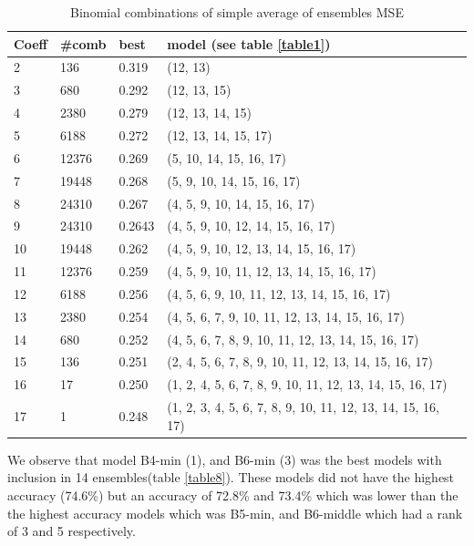 \documentclass[10pt,letterpaper]{article}
\begin{document}
\begin{center}
\begin{table}[hbt!]
\caption{Binomial combinations of simple average of ensembles MSE}
\begin{tabular}{ |l|l|l|l| }
\hline
Coeff & \#comb & best & model  (see table \ref{table1}) \\ \hline
2 & 136 & 0.319 & (12, 13) \\ \hline
3 & 680 & 0.292 & (12, 13, 15) \\ \hline
4 & 2380 & 0.279 & (12, 13, 14, 15) \\ \hline
5 & 6188 & 0.272 & (12, 13, 14, 15, 17) \\ \hline
6 & 12376 & 0.269 & (5, 10, 14, 15, 16, 17) \\ \hline
7 & 19448 & 0.268 & (5, 9, 10, 14, 15, 16, 17) \\ \hline
8 & 24310 & 0.267 & (4, 5, 9, 10, 14, 15, 16, 17) \\ \hline
9 & 24310 & 0.2643 & (4, 5, 9, 10, 12, 14, 15, 16, 17) \\ \hline
10 & 19448 & 0.262 & (4, 5, 9, 10, 12, 13, 14, 15, 16, 17) \\ \hline
11 & 12376 & 0.259 & (4, 5, 9, 10, 11, 12, 13, 14, 15, 16, 17) \\ \hline
12 & 6188 & 0.256 & (4, 5, 6, 9, 10, 11, 12, 13, 14, 15, 16, 17) \\ \hline
13 & 2380 & 0.254 & (4, 5, 6, 7, 9, 10, 11, 12, 13, 14, 15, 16, 17) \\ \hline
14 & 680 & 0.252 & (4, 5, 6, 7, 8, 9, 10, 11, 12, 13, 14, 15, 16, 17) \\ \hline
15 & 136 & 0.251 & (2, 4, 5, 6, 7, 8, 9, 10, 11, 12, 13, 14, 15, 16, 17) \\ \hline
16 & 17 & 0.250 & (1, 2, 4, 5, 6, 7, 8, 9, 10, 11, 12, 13, 14, 15, 16, 17) \\ \hline
17 & 1 & 0.248 & (1, 2, 3, 4, 5, 6, 7, 8, 9, 10, 11, 12, 13, 14, 15, 16, 17) \\ \hline
\end{tabular}
\label{table7}
\end{table}
\end{center}

We observe that model B4-min (1), and B6-min (3) was the best models with inclusion in 14 ensembles(table \ref{table8}). These models did not have the highest accuracy (74.6\%) but an accuracy of 72.8\% and 73.4\% which was lower than the the highest accuracy models which was B5-min, and B6-middle which had a rank of 3 and 5 respectively.
\end{document}
